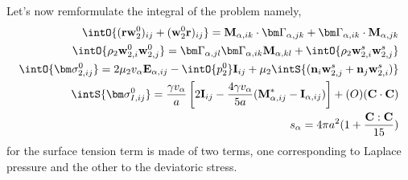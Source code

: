 Let's now remformulate the integral of the problem namely, 
\begin{align}
    \intO{(\textbf{rw}_2^0 )_{ij}+ (\textbf{w}_2^0 \textbf{r})_{ij}} 
    = \textbf{M}_{\alpha,ik} \cdot \bm\Gamma_{\alpha,jk}
        +  \bm\Gamma_{\alpha,ik} \cdot \textbf{M}_{\alpha,jk}
    \\
    \intO{\rho_2 \textbf{w}_{2,i}^0\textbf{w}_{2,j}^0}
    = \bm\Gamma_{\alpha,jl}\bm\Gamma_{\alpha,ik} \textbf{M}_{\alpha,kl}  
        +\intO{\rho_2 \textbf{w}_{2,i}^s\textbf{w}_{2,j}^s}
    \\
    \intO{\bm\sigma_{2,ij}^0}
    =
    2 \mu_2 v_\alpha \textbf{E}_{\alpha,ij}
    - \intO{p_2^0} \textbf{I}_{ij}
    + \mu_2 \intS{(\textbf{n}_i \textbf{w}_{2,j}^s + \textbf{n}_j \textbf{w}_{2,i}^s)}
    \\
    \intS{\bm\sigma_{I,ij}^0}
    = \frac{\gamma v_\alpha }{a} \left[
        2\textbf{I}_{ij} 
        - \frac{4 \gamma v_\alpha }{5 a} (\textbf{M}_{\alpha,ij}^* - \textbf{I}_{\alpha,ij})
    \right]
    +\mathcal(O)(\textbf{C}\cdot \textbf{C})\\
    s_\alpha 
    = 4\pi a^2 (1+\frac{\textbf{C}:\textbf{C}}{15})
\end{align}
for the surface tension term is made of two terms, one corresponding to Laplace pressure and the other to the deviatoric stress. 

